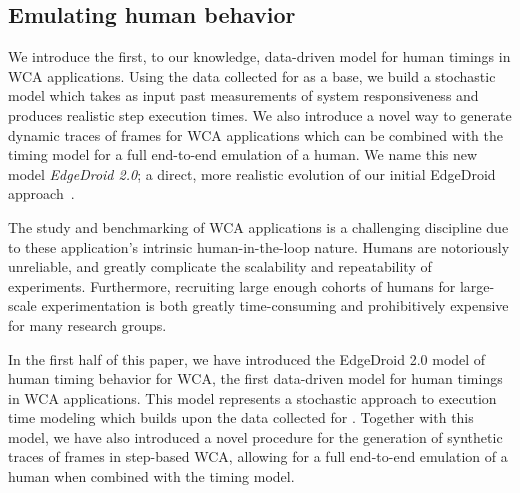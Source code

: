 \subsection{Emulating human behavior}

We introduce the first, to our knowledge, data-driven model for human timings in \gls{WCA} applications.
Using the data collected for \textcite{olguinmunoz:impact2021} as a base, we build a stochastic model which takes as
input past measurements of system responsiveness and produces realistic step execution times.
We also introduce a novel way to generate dynamic traces of frames for \gls{WCA} applications which can be combined
with the timing model for a full end-to-end emulation of a human.
We name this new model \emph{EdgeDroid 2.0}; a direct, more realistic evolution of our initial EdgeDroid
approach~\cite{olguin2018scaling,olguin2019edgedroid}.

The study and benchmarking of \gls{WCA} applications is a challenging discipline due to these application's intrinsic
human-in-the-loop nature.
Humans are notoriously unreliable, and greatly complicate the scalability and repeatability of experiments.
Furthermore, recruiting large enough cohorts of humans for large-scale experimentation is both greatly time-consuming
and prohibitively expensive for many research groups.

In the first half of this paper, we have introduced the EdgeDroid 2.0 model of human timing behavior for \gls{WCA},
the first data-driven model for human timings in \gls{WCA} applications.
This model represents a stochastic approach to execution time modeling which builds upon the data collected for
\textcite{olguinmunoz:impact2021}.
Together with this model, we have also introduced a novel procedure for the generation of synthetic traces of frames in step-based \gls{WCA}, allowing for a full end-to-end emulation of a human when combined with the timing model.

